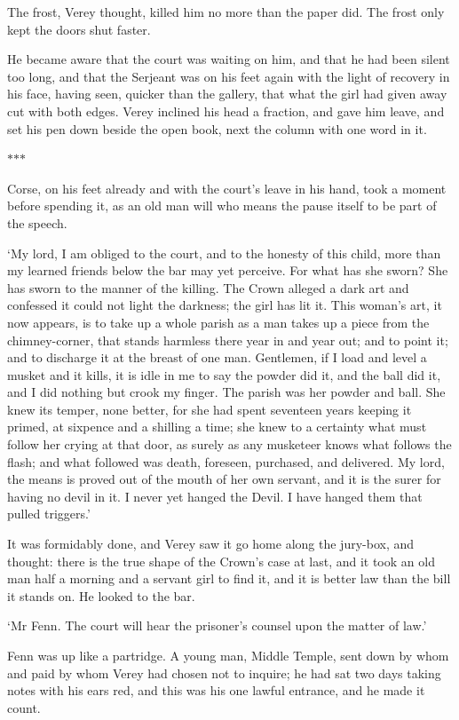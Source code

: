 \documentclass[11pt]{article}
\newcommand{\scenebreak}{%
  \par\vspace{1.1\baselineskip}%
  {\centering $\ast$\quad$\ast$\quad$\ast$\par}%
  \vspace{1.1\baselineskip}\noindent}
\begin{document}
The frost, Verey thought, killed him no more than the paper did. The frost only kept the doors shut faster.

He became aware that the court was waiting on him, and that he had been silent too long, and that the Serjeant was on his feet again with the light of recovery in his face, having seen, quicker than the gallery, that what the girl had given away cut with both edges. Verey inclined his head a fraction, and gave him leave, and set his pen down beside the open book, next the column with one word in it.

\scenebreak
\noindent Corse, on his feet already and with the court's leave in his hand, took a moment before spending it, as an old man will who means the pause itself to be part of the speech.

`My lord, I am obliged to the court, and to the honesty of this child, more than my learned friends below the bar may yet perceive. For what has she sworn? She has sworn to the manner of the killing. The Crown alleged a dark art and confessed it could not light the darkness; the girl has lit it. This woman's art, it now appears, is to take up a whole parish as a man takes up a piece from the chimney-corner, that stands harmless there year in and year out; and to point it; and to discharge it at the breast of one man. Gentlemen, if I load and level a musket and it kills, it is idle in me to say the powder did it, and the ball did it, and I did nothing but crook my finger. The parish was her powder and ball. She knew its temper, none better, for she had spent seventeen years keeping it primed, at sixpence and a shilling a time; she knew to a certainty what must follow her crying at that door, as surely as any musketeer knows what follows the flash; and what followed was death, foreseen, purchased, and delivered. My lord, the means is proved out of the mouth of her own servant, and it is the surer for having no devil in it. I never yet hanged the Devil. I have hanged them that pulled triggers.'

It was formidably done, and Verey saw it go home along the jury-box, and thought: there is the true shape of the Crown's case at last, and it took an old man half a morning and a servant girl to find it, and it is better law than the bill it stands on. He looked to the bar.

`Mr Fenn. The court will hear the prisoner's counsel upon the matter of law.'

Fenn was up like a partridge. A young man, Middle Temple, sent down by whom and paid by whom Verey had chosen not to inquire; he had sat two days taking notes with his ears red, and this was his one lawful entrance, and he made it count.
\end{document}
